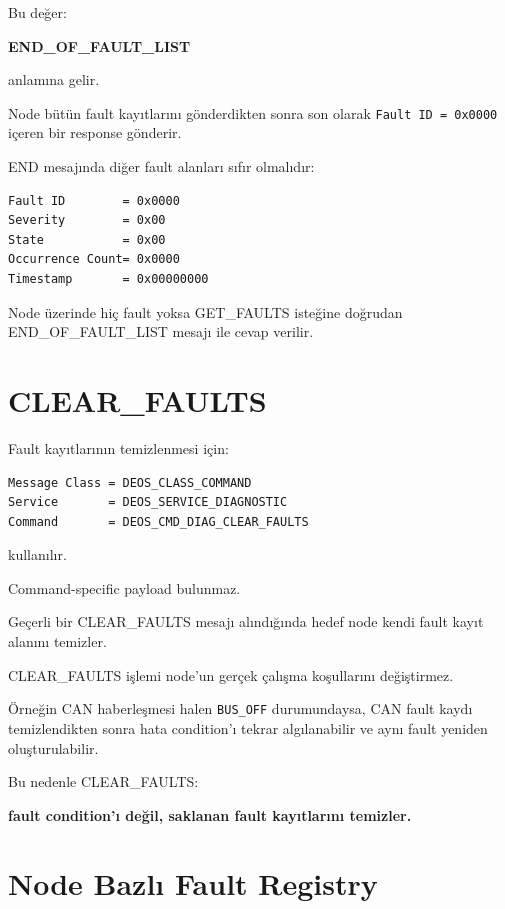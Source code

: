 \documentclass[a4paper,11pt]{article}
\begin{document}
Bu değer:

\begin{center}
\textbf{END\_OF\_FAULT\_LIST}
\end{center}

anlamına gelir.

Node bütün fault kayıtlarını gönderdikten sonra son olarak
\texttt{Fault ID = 0x0000} içeren bir response gönderir.

END mesajında diğer fault alanları sıfır olmalıdır:

\begin{lstlisting}
Fault ID        = 0x0000
Severity        = 0x00
State           = 0x00
Occurrence Count= 0x0000
Timestamp       = 0x00000000
\end{lstlisting}

Node üzerinde hiç fault yoksa GET\_FAULTS isteğine doğrudan
END\_OF\_FAULT\_LIST mesajı ile cevap verilir.

\section{CLEAR\_FAULTS}

Fault kayıtlarının temizlenmesi için:

\begin{lstlisting}
Message Class = DEOS_CLASS_COMMAND
Service       = DEOS_SERVICE_DIAGNOSTIC
Command       = DEOS_CMD_DIAG_CLEAR_FAULTS
\end{lstlisting}

kullanılır.

Command-specific payload bulunmaz.

Geçerli bir CLEAR\_FAULTS mesajı alındığında hedef node kendi fault
kayıt alanını temizler.

CLEAR\_FAULTS işlemi node'un gerçek çalışma koşullarını değiştirmez.

Örneğin CAN haberleşmesi halen \texttt{BUS\_OFF} durumundaysa,
CAN fault kaydı temizlendikten sonra hata condition'ı tekrar
algılanabilir ve aynı fault yeniden oluşturulabilir.

Bu nedenle CLEAR\_FAULTS:

\begin{center}
\textbf{fault condition'ı değil, saklanan fault kayıtlarını temizler.}
\end{center}

\section{Node Bazlı Fault Registry}
\end{document}
